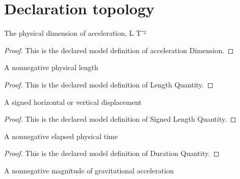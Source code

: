 \section{Declaration topology}
\begin{definition}
  \label{def:physics:phyx-mini-0746:phyxminiproblems-problemphyxmini0746-accelerationdimension}
  The physical dimension of acceleration, L T⁻²
\end{definition}
\begin{proof}
  This is the declared model definition of acceleration Dimension.
\end{proof}
\begin{definition}
  \label{def:physics:phyx-mini-0746:phyxminiproblems-problemphyxmini0746-lengthquantity}
  A nonnegative physical length
\end{definition}
\begin{proof}
  This is the declared model definition of Length Quantity.
\end{proof}
\begin{definition}
  \label{def:physics:phyx-mini-0746:phyxminiproblems-problemphyxmini0746-signedlengthquantity}
  A signed horizontal or vertical displacement
\end{definition}
\begin{proof}
  This is the declared model definition of Signed Length Quantity.
\end{proof}
\begin{definition}
  \label{def:physics:phyx-mini-0746:phyxminiproblems-problemphyxmini0746-durationquantity}
  A nonnegative elapsed physical time
\end{definition}
\begin{proof}
  This is the declared model definition of Duration Quantity.
\end{proof}
\begin{definition}
  \label{def:physics:phyx-mini-0746:phyxminiproblems-problemphyxmini0746-accelerationquantity}
  A nonnegative magnitude of gravitational acceleration
\end{definition}
